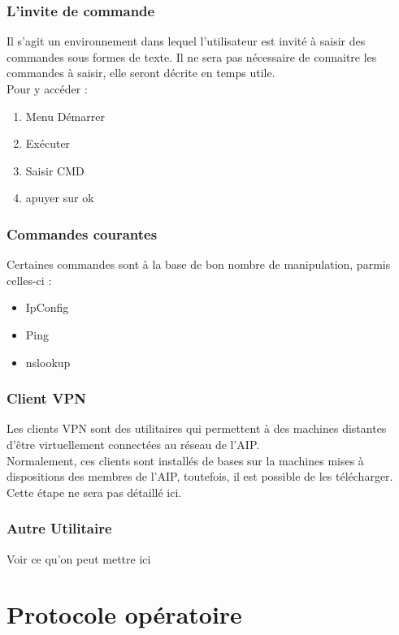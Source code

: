 \documentclass[a4paper]{article}
\begin{document}
\subsubsection{L'invite de commande}
Il s'agit un environnement dans lequel l'utilisateur est invité à saisir des commandes sous formes de texte.
Il ne sera pas nécessaire de connaitre les commandes à saisir, elle seront décrite en temps utile.\\
Pour y accéder :
\begin{enumerate}
	\item Menu Démarrer
	\item Exécuter
	\item Saisir CMD
	\item apuyer sur ok
\end{enumerate}
\subsubsection{Commandes courantes}
Certaines commandes sont à la base de bon nombre de manipulation, parmis celles-ci : 
\begin{itemize}
\item IpConfig
\item Ping
\item nslookup
\end{itemize}

\subsubsection{Client VPN}
Les clients VPN sont des utilitaires qui permettent à des machines distantes d'être virtuellement connectées au réseau de l'AIP.\\
Normalement, ces clients sont installés de bases sur la machines mises à dispositions des membres de l'AIP, toutefois, il est possible de les télécharger. Cette étape ne sera pas détaillé ici.

\subsubsection{Autre Utilitaire}
Voir ce qu'on peut mettre ici


\section{Protocole opératoire}
\end{document}
